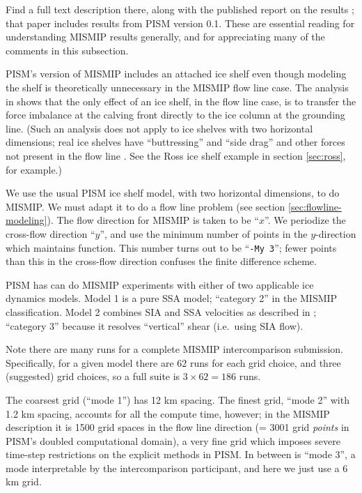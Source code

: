 \noindent Find a full text description there, along with the published report on the results \cite{MISMIP2012}; that paper includes results from PISM version 0.1.  These are essential reading for understanding MISMIP results generally, and for appreciating many of the comments in this subsection.

PISM's version of MISMIP includes an attached ice shelf even though modeling the shelf is theoretically unnecessary in the MISMIP flow line case.  The analysis in \cite{SchoofMarine1} shows that the only effect of an ice shelf, in the flow line case, is to transfer the force imbalance at the calving front directly to the ice column at the grounding line.  (Such an analysis does not apply to ice shelves with two horizontal dimensions; real ice shelves have ``buttressing'' and ``side drag'' and other forces not present in the flow line \cite{Goldbergetal2009}.  See the Ross ice shelf example in section \ref{sec:ross}, for example.)

We use the usual PISM ice shelf model, with two horizontal dimensions, to do MISMIP.  We must adapt it to do a flow line problem (see section \ref{sec:flowline-modeling}).  The flow direction for MISMIP is taken to be ``$x$''.  We periodize the cross-flow direction ``$y$'', and use the minimum number of points in the $y$-direction which maintains function.  This number turns out to be ``\texttt{-My 3}''; fewer points than this in the cross-flow direction confuses the finite difference scheme.

PISM has can do MISMIP experiments with either of two applicable ice dynamics models.  Model 1 is a pure SSA model; ``category 2'' in the MISMIP classification.  Model 2 combines SIA and SSA velocities as described in \cite{Winkelmannetal2011}; ``category 3'' because it resolves ``vertical'' shear (i.e.~using SIA flow).

Note there are many runs for a complete MISMIP intercomparison submission.  Specifically, for a given model there are $62$ runs for each grid choice, and three (suggested) grid choices, so a full suite is $3 \times 62 = 186$ runs.

The coarsest grid (``mode 1'') has 12 km spacing.  The finest grid, ``mode 2'' with 1.2 km spacing, accounts for all the compute time, however; in the MISMIP description it is 1500 grid spaces in the flow line direction (= 3001 grid \emph{points} in PISM's doubled computational domain), a very fine grid which imposes severe time-step restrictions on the explicit methods in PISM.  In between is ``mode 3'', a mode interpretable by the intercomparison participant, and here we just use a 6 km grid.

